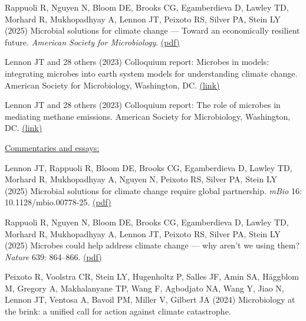 \documentclass[11pt]{article}
\begin{document}
\begin{etaremune}
\item Rappuoli R, Nguyen N, Bloom DE, Brooks CG, Egamberdieva D, Lawley TD, Morhard R, Mukhopadhyay A, Lennon JT, Peixoto RS, Silver PA, Stein LY (2025) Microbial solutions for climate change — Toward an economically resilient future. \textit{American Society for Microbiology}. \href{https://lennonlab.github.io/assets/publications/Rappuoli_etal_2025b.pdf}{(pdf)}

\item Lennon JT and 28 others (2023) Colloquium report: Microbes in models: integrating microbes into earth system models for understanding climate change. American Society for Microbiology, Washington, DC. \href{https://www.ncbi.nlm.nih.gov/books/NBK592518/}{(link)}

\item Lennon JT and 28 others (2023) Colloquium report: The role of microbes in mediating methane emissions. American Society for Microbiology, Washington, DC. \href{https://pubmed.ncbi.nlm.nih.gov/38194471/}{(link)}

\vspace{1em}
\item[] \textnormal{\underline{Commentaries and essays:}}

\item Lennon JT, Rappuoli R, Bloom DE, Brooks CG, Egamberdieva D, Lawley TD, Morhard R, Mukhopadhyay A, Nguyen N, Peixoto RS, Silver PA, Stein LY (2025) Microbial solutions for climate change require global partnership. \textit{mBio} 16: 10.1128/mbio.00778-25. \href{https://lennonlab.github.io/assets/publications/Lennon_etal_2025a.pdf}{(pdf)}

\item Rappuoli R, Nguyen N, Bloom DE, Brooks CG, Egamberdieva D, Lawley TD, Morhard R, Mukhopadhyay A, Lennon JT, Peixoto RS, Silver PA, Stein LY (2025) Microbes could help address climate change — why aren’t we using them? \textit{Nature} 639: 864–866. \href{https://lennonlab.github.io/assets/publications/Rappuoli_etal_2025a.pdf}{(pdf)}

\item Peixoto R, Voolstra CR, Stein LY, Hugenholtz P, Salles JF, Amin SA, Häggblom M, Gregory A, Makhalanyane TP, Wang F, Agbodjato NA, Wang Y, Jiao N, Lennon JT, Ventosa A, Bavoil PM, Miller V, Gilbert JA (2024) Microbiology at the brink: a unified call for action against climate catastrophe. 


\end{etaremune}
\end{document}
